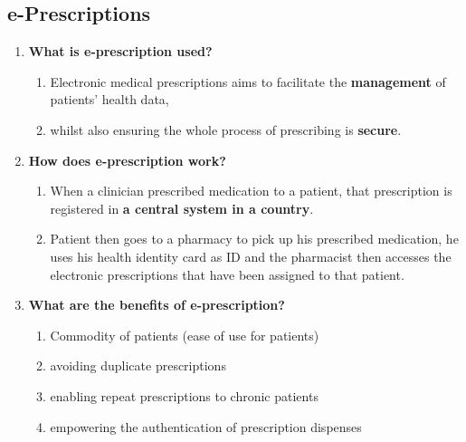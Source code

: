 \documentclass[10pt, twoside]{article}   	%
\begin{document}
\subsection{e-Prescriptions }
\begin{enumerate}
\item \textbf{What is e-prescription used?}
    \begin{enumerate}
        \item Electronic medical prescriptions aims to facilitate the \textbf{management} of patients' health data, 
        \item whilst also ensuring the whole process of prescribing is \textbf{secure}. 
    \end{enumerate}
   \item \textbf{How does e-prescription work?}
    \begin{enumerate}
        \item When a clinician prescribed medication to a patient, that prescription is registered in \textbf{a central system in a country}.         
         \item Patient then goes to a pharmacy to pick up his prescribed medication, he uses his health identity card as ID and the pharmacist then accesses the electronic prescriptions that have been assigned to that patient.
     \end{enumerate}
\item \textbf{What are the benefits of e-prescription?}
    \begin{enumerate}
        \item Commodity of patients (ease of use for patients)
        \item avoiding duplicate prescriptions
        \item enabling repeat prescriptions to chronic patients
        \item empowering the authentication of prescription dispenses
    \end{enumerate}    
\end {enumerate}
\end{document}
